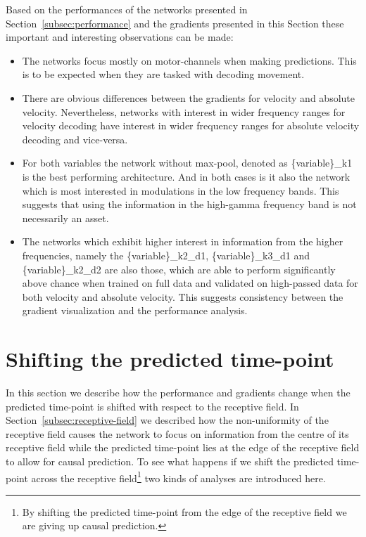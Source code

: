 Based on the performances of the networks presented in Section~\ref{subsec:performance} and the gradients presented in this Section these important and interesting observations can be made:

\begin{itemize}
    \item The networks focus mostly on motor-channels when making predictions.
This is to be expected when they are tasked with decoding movement.
    \item There are obvious differences between the gradients for velocity and absolute velocity.
    Nevertheless, networks with interest in wider frequency ranges for velocity decoding have interest in wider frequency ranges for absolute velocity decoding and vice-versa.
    \item For both variables the network without max-pool, denoted as \{variable\}\_k1 is the best performing architecture.
    And in both cases is it also the network which is most interested in modulations in the low frequency bands.
    This suggests that using the information in the high-gamma frequency band is not necessarily an asset.
    \item The networks which exhibit higher interest in information from the higher frequencies, namely the \{variable\}\_k2\_d1, \{variable\}\_k3\_d1 and \{variable\}\_k2\_d2 are also those, which are able to perform significantly above chance when trained on full data and validated on high-passed data for both velocity and absolute velocity.
    This suggests consistency between the gradient visualization and the performance analysis.

\end{itemize}


\section{Shifting the predicted time-point}\label{sec:shifting-the-predicted-time-point}
In this section we describe how the performance and gradients change when the predicted time-point is shifted with respect to the receptive field. In Section~\ref{subsec:receptive-field} we described how the non-uniformity of the receptive field causes the network to focus on information from the centre of its receptive field while the predicted time-point lies at the edge of the receptive field to allow for causal prediction. To see what happens if we shift the predicted time-point across the receptive field\footnote{By shifting the predicted time-point from the edge of the receptive field we are giving up causal prediction.} two kinds of analyses are introduced here.

